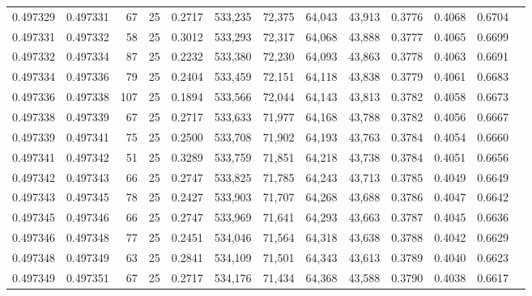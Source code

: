 \begin{tabular}{rrrrrrrrrrrrr}
0.497329 & 0.497331 &    67 &  25 &                                     0.2717 & 533,235 &  72,375 &  64,043 &  43,913 & 0.3776 & 0.4068 & 0.6704 \\
0.497331 & 0.497332 &    58 &  25 &                                     0.3012 & 533,293 &  72,317 &  64,068 &  43,888 & 0.3777 & 0.4065 & 0.6699 \\
0.497332 & 0.497334 &    87 &  25 &                                     0.2232 & 533,380 &  72,230 &  64,093 &  43,863 & 0.3778 & 0.4063 & 0.6691 \\
0.497334 & 0.497336 &    79 &  25 &                                     0.2404 & 533,459 &  72,151 &  64,118 &  43,838 & 0.3779 & 0.4061 & 0.6683 \\
0.497336 & 0.497338 &   107 &  25 &                                     0.1894 & 533,566 &  72,044 &  64,143 &  43,813 & 0.3782 & 0.4058 & 0.6673 \\
0.497338 & 0.497339 &    67 &  25 &                                     0.2717 & 533,633 &  71,977 &  64,168 &  43,788 & 0.3782 & 0.4056 & 0.6667 \\
0.497339 & 0.497341 &    75 &  25 &                                     0.2500 & 533,708 &  71,902 &  64,193 &  43,763 & 0.3784 & 0.4054 & 0.6660 \\
0.497341 & 0.497342 &    51 &  25 &                                     0.3289 & 533,759 &  71,851 &  64,218 &  43,738 & 0.3784 & 0.4051 & 0.6656 \\
0.497342 & 0.497343 &    66 &  25 &                                     0.2747 & 533,825 &  71,785 &  64,243 &  43,713 & 0.3785 & 0.4049 & 0.6649 \\
0.497343 & 0.497345 &    78 &  25 &                                     0.2427 & 533,903 &  71,707 &  64,268 &  43,688 & 0.3786 & 0.4047 & 0.6642 \\
0.497345 & 0.497346 &    66 &  25 &                                     0.2747 & 533,969 &  71,641 &  64,293 &  43,663 & 0.3787 & 0.4045 & 0.6636 \\
0.497346 & 0.497348 &    77 &  25 &                                     0.2451 & 534,046 &  71,564 &  64,318 &  43,638 & 0.3788 & 0.4042 & 0.6629 \\
0.497348 & 0.497349 &    63 &  25 &                                     0.2841 & 534,109 &  71,501 &  64,343 &  43,613 & 0.3789 & 0.4040 & 0.6623 \\
0.497349 & 0.497351 &    67 &  25 &                                     0.2717 & 534,176 &  71,434 &  64,368 &  43,588 & 0.3790 & 0.4038 & 0.6617 \\

\end{tabular}

